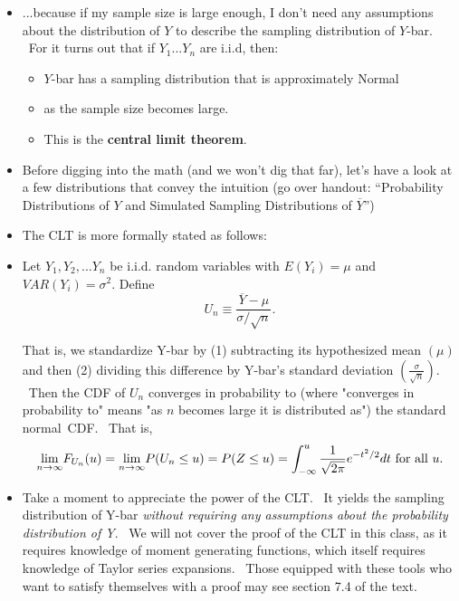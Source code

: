 \documentclass[11pt]{article}
\begin{document}
\begin{itemize}
\item ...because if my sample size is large enough, I don't need any
assumptions about the distribution of $Y$ to describe the sampling
distribution of $Y$-bar. \ For it turns out that if $Y_{1}...Y_{n}$ are
i.i.d, then:

\begin{itemize}
\item $Y$-bar has a sampling distribution that is approximately Normal

\item as the sample size becomes large. \ 

\item This is the \textbf{central limit theorem}.
\end{itemize}

\item Before digging into the math (and we won't dig that far), let's have a
look at a few distributions that convey the intuition (go over handout:
\textquotedblleft Probability Distributions of $Y$ and Simulated Sampling
Distributions of $\overline{Y}$\textquotedblright )

\item The CLT is more formally stated as follows:

\item Let $Y_{1},Y_{2},...Y_{n}$ be i.i.d. random variables with $%
E(Y_{i})=\mu $ and $VAR(Y_{i})=\sigma ^{2}.$ Define%
\begin{equation*}
U_{n}\equiv \frac{\overline{Y}-\mu }{\sigma /\sqrt{n}}.
\end{equation*}

That is, we standardize Y-bar by (1) subtracting its hypothesized mean $(\mu
)$ and then (2) dividing this difference by Y-bar's standard deviation $(%
\frac{\sigma }{\sqrt{n}}).$ \ Then the CDF of $U_{n}$ converges in
probability to (where "converges in probability to" means "as $n$ becomes
large it is distributed as") the standard normal\ CDF. \ That is,%
\begin{equation*}
\underset{n\rightarrow \infty }{\lim }F_{U_{n}}(u)=\underset{n\rightarrow
\infty }{\lim }P(U_{n}\leq u)=P(Z\leq u)=\int_{-\infty }^{u}\frac{1}{\sqrt{%
2\pi }}e^{-t^{2}/2}dt\text{ for all }u\text{.}
\end{equation*}

\item Take a moment to appreciate the power of the CLT. \ It yields the
sampling distribution of Y-bar \textit{without requiring any assumptions
about the probability distribution of Y}. \ We will not cover the proof of
the CLT in this class, as it requires knowledge of moment generating
functions, which itself requires knowledge of Taylor series expansions. \
Those equipped with these tools who want to satisfy themselves with a proof
may see section 7.4 of the text.
\end{itemize}
\end{document}
